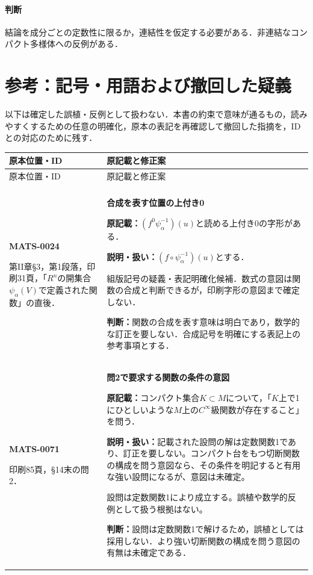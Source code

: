 \documentclass[a4paper,10pt]{ltjsarticle}
\begin{document}
\paragraph{判断}結論を成分ごとの定数性に限るか，連結性を仮定する必要がある．非連結なコンパクト多様体への反例がある．

\clearpage\section{参考：記号・用語および撤回した疑義}\label{part:notes}
以下は確定した誤植・反例として扱わない．本書の約束で意味が通るもの，読みやすくするための任意の明確化，原本の表記を再確認して撤回した指摘を，IDとの対応のために残す．
\small
\begin{longtable}{@{}>{\raggedright\arraybackslash}p{.19\linewidth}>{\raggedright\arraybackslash}p{.77\linewidth}@{}}
\toprule 原本位置・ID & 原記載と修正案\\\midrule\endfirsthead
\toprule 原本位置・ID & 原記載と修正案\\\midrule\endhead
\midrule\multicolumn{2}{r}{次頁へ続く}\\\endfoot
\bottomrule\endlastfoot
\hypertarget{MATS-0024}{}\textbf{MATS-0024}\par 第II章\S3，第1段落，印刷31頁，「$R^n$の開集合$\psi_\alpha(V)$で定義された関数」の直後． & \textbf{合成を表す位置の上付き0}\par\textbf{原記載：}$(f^0\psi_\alpha^{-1})(u)$と読める上付き0の字形がある．\par\textbf{説明・扱い：}$(f\circ\psi_\alpha^{-1})(u)$とする．\par 組版記号の疑義・表記明確化候補．数式の意図は関数の合成と判断できるが，印刷字形の意図まで確定しない．\par\textbf{判断：}関数の合成を表す意味は明白であり，数学的な訂正を要しない．合成記号を明確にする表記上の参考事項とする． \\[3pt]
\hline
\hypertarget{MATS-0071}{}\textbf{MATS-0071}\par 印刷85頁，\S14末の問2． & \textbf{問2で要求する関数の条件の意図}\par\textbf{原記載：}コンパクト集合$K\subset M$について，「$K$上で1にひとしいような$M$上の$C^\infty$級関数が存在すること」を問う．\par\textbf{説明・扱い：}記載された設問の解は定数関数1であり、訂正を要しない。コンパクト台をもつ切断関数の構成を問う意図なら、その条件を明記すると有用な強い設問になるが、意図は未確定。\par 設問は定数関数1により成立する。誤植や数学的反例として扱う根拠はない。\par\textbf{判断：}設問は定数関数1で解けるため，誤植としては採用しない．より強い切断関数の構成を問う意図の有無は未確定である． \\[3pt]

\end{longtable}
\end{document}
